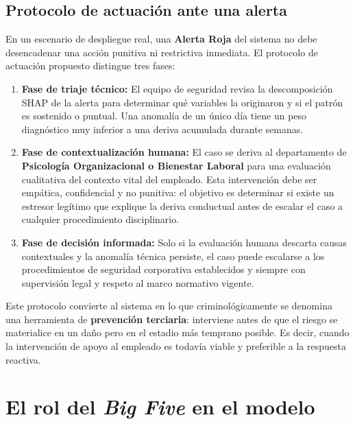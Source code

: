 \documentclass[IB]{TFUOC}%
\begin{document}
\subsection*{Protocolo de actuación ante una alerta}

En un escenario de despliegue real, una \textbf{Alerta Roja} del sistema 
no debe desencadenar una acción punitiva ni restrictiva inmediata. 
El protocolo de actuación propuesto distingue tres fases:

\begin{enumerate}
    \item \textbf{Fase de triaje técnico:} El equipo de seguridad 
    revisa la descomposición SHAP de la alerta para determinar qué 
    variables la originaron y si el patrón es sostenido o puntual. 
    Una anomalía de un único día tiene un peso diagnóstico muy 
    inferior a una deriva acumulada durante semanas.
    
    \item \textbf{Fase de contextualización humana:} El caso se 
    deriva al departamento de \textbf{Psicología Organizacional o 
    Bienestar Laboral} para una evaluación cualitativa del contexto 
    vital del empleado. Esta intervención debe ser empática, 
    confidencial y no punitiva: el objetivo es determinar si existe 
    un estresor legítimo que explique la deriva conductual antes 
    de escalar el caso a cualquier procedimiento disciplinario.
    
    \item \textbf{Fase de decisión informada:} Solo si la evaluación 
    humana descarta causas contextuales y la anomalía técnica 
    persiste, el caso puede escalarse a los procedimientos de 
    seguridad corporativa establecidos y siempre con supervisión 
    legal y respeto al marco normativo vigente.
\end{enumerate}

\noindent Este protocolo convierte al sistema en lo que criminológicamente 
se denomina una herramienta de \textbf{prevención terciaria}: interviene 
antes de que el riesgo se materialice en un daño pero en el estadio más 
temprano posible. Es decir, cuando la intervención de apoyo al empleado es todavía 
viable y preferible a la respuesta reactiva.


\section{El rol del \textit{Big Five} en el modelo}
\end{document}
